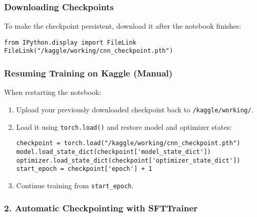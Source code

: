 \documentclass[a4paper, 12pt]{article}
\begin{document}
\subsubsection*{Downloading Checkpoints}

To make the checkpoint persistent, download it after the notebook finishes:

\begin{tcolorbox}[colback=green!5!white, colframe=green!75!black, title=Download Example]
\begin{verbatim}
from IPython.display import FileLink
FileLink("/kaggle/working/cnn_checkpoint.pth")
\end{verbatim}
\end{tcolorbox}

\subsubsection*{Resuming Training on Kaggle (Manual)}

When restarting the notebook:

\begin{enumerate}
    \item Upload your previously downloaded checkpoint back to \texttt{/kaggle/working/}.
    \item Load it using \texttt{torch.load()} and restore model and optimizer states:
    
\begin{tcolorbox}[colback=yellow!5!white, colframe=yellow!75!black, title=Example: SFTTrainer Automatic Checkpointing]
\begin{verbatim}
checkpoint = torch.load("/kaggle/working/cnn_checkpoint.pth")
model.load_state_dict(checkpoint['model_state_dict'])
optimizer.load_state_dict(checkpoint['optimizer_state_dict'])
start_epoch = checkpoint['epoch'] + 1
\end{verbatim}
\end{tcolorbox}

    \item Continue training from \texttt{start\_epoch}.
\end{enumerate}

\subsubsection*{2. Automatic Checkpointing with SFTTrainer}
\end{document}
